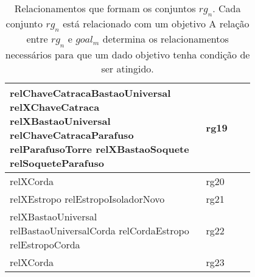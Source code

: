 \begin{table}[H]
\begin{tabular}{|p{0.8\linewidth}|l|}
relChaveCatracaBastaoUniversal relXChaveCatraca relXBastaoUniversal relChaveCatracaParafuso relParafusoTorre relXBastaoSoquete relSoqueteParafuso                                                                                                     & rg19        \\ \hline
relXCorda                                                                                                                                                                                                                                                                                                                                 & rg20        \\ \hline
relXEstropo relEstropoIsoladorNovo                                                                                                                                                                                                                                                                                                        & rg21        \\ \hline
relXBastaoUniversal relBastaoUniversalCorda relCordaEstropo relEstropoCorda                                                                                                                                                                                                                                                               & rg22        \\ \hline
relXCorda                                                                                                                                                                                                                                                                                                                                 & rg23        \\ \hline
\end{tabular}
\caption{Relacionamentos que formam os conjuntos $rg_n$. Cada conjunto $rg_n$ está relacionado com um objetivo A relação entre $rg_n$ e $goal_m$ determina os relacionamentos necessários para que um dado objetivo tenha condição de ser atingido.}
\label{relationsgroup1}
\end{table}


